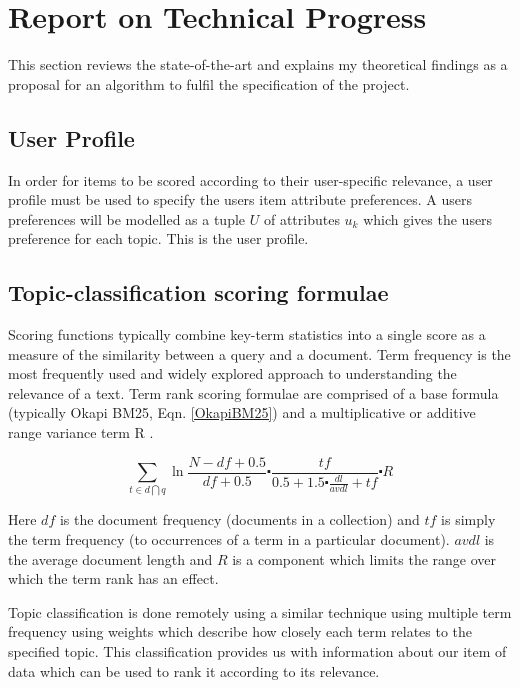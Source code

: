\chapter{Report on Technical Progress}
 
This section reviews the state-of-the-art and explains my theoretical findings as a proposal for an algorithm to fulfil the specification of the project. 

\section{User Profile}

In order for items to be scored according to their user-specific relevance, a user profile must be used to specify the users item attribute preferences. A users preferences will be modelled as a tuple $U$ of attributes $u_k$ which gives the users preference for each topic. This is the user profile.

\section{Topic-classification scoring formulae}

Scoring functions typically combine key-term statistics into a single score as a measure of the similarity between a query and a document.
Term frequency is the most frequently used and widely explored approach to understanding the relevance of a text. Term rank scoring formulae are comprised of a base formula (typically Okapi BM25, Eqn. \ref{OkapiBM25}) and a multiplicative or additive range variance term R \cite{OkapiBM25Paper}.

\begin{equation}\label{OkapiBM25}
	\sum\limits_{t\in d \bigcap q} \ln{\frac{N-df+0.5}{df+0.5}}\centerdot \frac{tf}{0.5+1.5 \centerdot \frac{dl}{avdl}+tf} \centerdot R
\end{equation}

Here $df$ is the document frequency (documents in a collection) and $tf$ is simply the term frequency (to occurrences of a term in a particular document). $avdl$ is the average document length and $R$ is a component which limits the range over which the term rank has an effect. 

Topic classification is done remotely using a similar technique using multiple term frequency using weights which describe how closely each term relates to the specified topic. This classification provides us with information about our item of data which can be used to rank it according to its relevance. 

